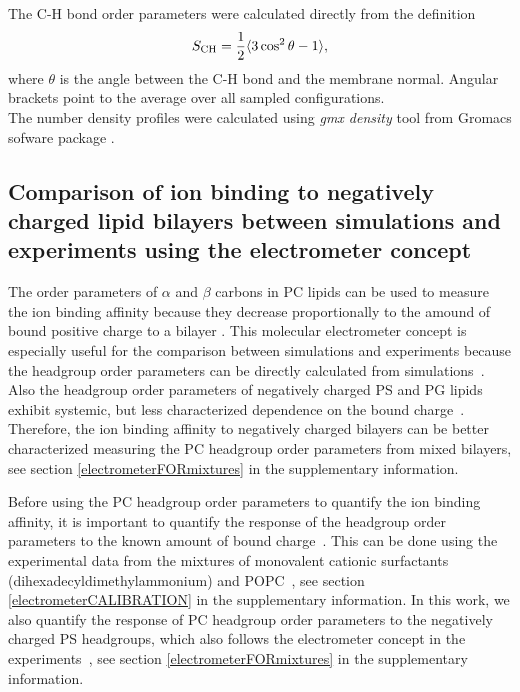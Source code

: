 \documentclass[aps,prl,superscriptaddress,twocolumn]{revtex4}
\begin{document}
The C-H bond order parameters were calculated directly
from the definition
\begin{equation}
S_{\rm CH}=\frac{1}{2}\langle 3\cos^2\theta -1 \rangle,
\end{equation}
where $\theta$ is the angle between the C-H bond and the membrane normal.
Angular brackets point to the average over all sampled configurations.
\\
The number density profiles were calculated using {\it gmx density} tool
from Gromacs sofware package \cite{gromacsMANUAL}.

\subsection{Comparison of ion binding to negatively charged lipid bilayers 
between simulations and experiments using the electrometer concept}

The order parameters of $\alpha$ and $\beta$ carbons in PC lipids
can be used to measure the ion binding affinity because they 
decrease proportionally to the amound of bound positive
charge to a bilayer \cite{akutsu81,altenbach84,seelig87}.
This molecular electrometer concept is especially useful for 
the comparison between simulations and experiments because
the headgroup order parameters can be directly calculated from 
simulations~\cite{catte16}. Also the headgroup order parameters
of negatively charged PS and PG lipids exhibit systemic, but less
characterized dependence on the bound charge~\cite{borle85,macdonald87,roux86,roux90}.
Therefore, the ion binding affinity to negatively charged bilayers
can be better characterized measuring the PC headgroup order parameters from 
mixed bilayers, see section \ref{electrometerFORmixtures} in the supplementary information.

Before using the PC headgroup order parameters to quantify the ion binding
affinity, it is important to quantify the response of the headgroup order
parameters to the known amount of bound charge~\cite{catte16,melcr18}.
This can be done using the experimental data from the mixtures of
monovalent cationic surfactants (dihexadecyldimethylammonium) and POPC~\cite{scherer89,melcr18},
see section \ref{electrometerCALIBRATION} in the supplementary information.
In this work, we also quantify the response of PC headgroup order parameters
to the negatively charged PS headgroups, which also follows the electrometer
concept in the experiments~\cite{scherer87},
see section \ref{electrometerFORmixtures} in the supplementary information.
\end{document}
